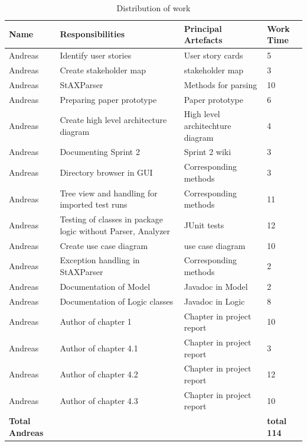 \begin{table}[!h]
  \caption{Distribution of work}
  \centering
  \begin{tabular}{p{2cm}||p{4.2cm}|p{4cm}|l|}
    Name & Responsibilities & Principal Artefacts & Work Time\\
    \hline
    \hline
    Andreas & Identify user stories & User story cards & 5 \\
    \hline
    Andreas & Create stakeholder map & stakeholder map & 3 \\ 
    \hline
    Andreas & StAXParser & Methods for parsing & 10 \\ 
    \hline
    Andreas & Preparing paper prototype & Paper prototype & 6 \\
    \hline
    Andreas & Create high level architecture diagram & High level architechture diagram & 4 \\ 
    \hline
    Andreas & Documenting Sprint 2 & Sprint 2 wiki & 3 \\ 
    \hline 
    Andreas & Directory browser in GUI & Corresponding methods & 3 \\ 
    \hline
    Andreas & Tree view and handling for imported test runs & Corresponding methods & 11 \\ 
    \hline
    Andreas & Testing of classes in package logic without Parser, Analyzer & JUnit tests & 12 \\ 
    \hline 
    Andreas & Create use case diagram & use case diagram & 10 \\ 
    \hline
    Andreas & Exception handling in StAXParser & Corresponding methods & 2 \\ 
    \hline
    Andreas & Documentation of Model & Javadoc in Model & 2 \\ 
    \hline
    Andreas & Documentation of Logic classes & Javadoc in Logic & 8 \\ 
    \hline
    Andreas & Author of chapter 1 & Chapter in project report & 10 \\ 
    \hline
    Andreas & Author of chapter 4.1 & Chapter in project report & 3 \\ 
    \hline
    Andreas & Author of chapter 4.2 & Chapter in project report & 12 \\
    \hline 
    Andreas & Author of chapter 4.3 & Chapter in project report & 10 \\ 
    \hline
    \hline 
    \textbf{Total \newline Andreas} & & & \textbf{total 114}   \\
    \hline
    \hline
  \end{tabular}
\end{table}
